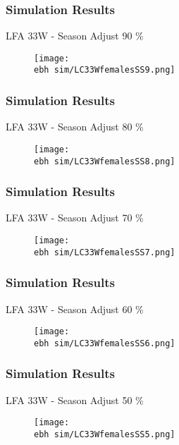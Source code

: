 \documentclass{beamer}
\newcommand{\ebh}{\string~/bio.data/bio.lobster/figures/LFA2733Framework2018/} %
\begin{document}
\begin{frame}
\frametitle{Simulation Results}
LFA 33W - Season Adjust 90 \%
\begin{figure}
        \begin{center}
            \texttt{[image: \\ebh sim/LC33WfemalesSS9.png]}
        \end{center}
    \end{figure}
\end{frame}


\begin{frame}
\frametitle{Simulation Results}
LFA 33W - Season Adjust 80 \%
\begin{figure}
        \begin{center}
            \texttt{[image: \\ebh sim/LC33WfemalesSS8.png]}
        \end{center}
    \end{figure}
\end{frame}


\begin{frame}
\frametitle{Simulation Results}
LFA 33W - Season Adjust 70 \%
\begin{figure}
        \begin{center}
            \texttt{[image: \\ebh sim/LC33WfemalesSS7.png]}
        \end{center}
    \end{figure}
\end{frame}


\begin{frame}
\frametitle{Simulation Results}
LFA 33W - Season Adjust 60 \%
\begin{figure}
        \begin{center}
            \texttt{[image: \\ebh sim/LC33WfemalesSS6.png]}
        \end{center}
    \end{figure}
\end{frame}


\begin{frame}
\frametitle{Simulation Results}
LFA 33W - Season Adjust 50 \%
\begin{figure}
        \begin{center}
            \texttt{[image: \\ebh sim/LC33WfemalesSS5.png]}
        \end{center}
    \end{figure}
\end{frame}
\end{document}
